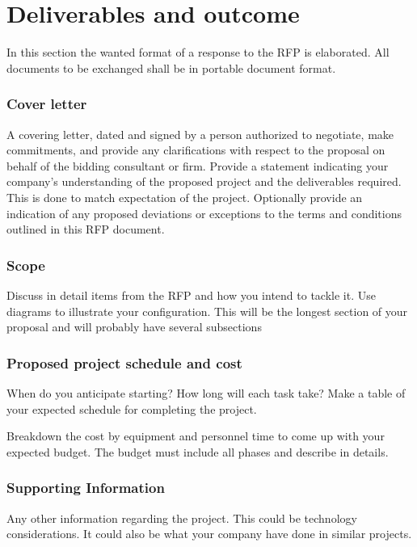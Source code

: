 \section{Deliverables and outcome}
In this section the wanted format of a response to the RFP is elaborated. All documents to be exchanged shall be in portable document format.

\subsubsection{Cover letter}
A covering letter, dated and signed by a person authorized to negotiate, make commitments, and provide any clarifications with respect to the proposal on behalf of the bidding consultant or firm. Provide a statement indicating your company’s understanding of the proposed project and the deliverables required. This is done to match expectation of the project. Optionally provide an indication of any proposed deviations or exceptions to the terms and conditions outlined in this RFP document.

\subsubsection{Scope}
Discuss in detail items from the RFP and how you intend to tackle it. Use diagrams to illustrate your configuration. This will be the longest section of your proposal and will probably have several subsections

\subsubsection{Proposed project schedule and cost}
When do you anticipate starting? How long will each task take? Make a table of your expected schedule for completing the project.

Breakdown the cost by equipment and personnel time to come up with your expected budget. The budget must include all phases and describe in details. 

\subsubsection{Supporting Information}
Any other information regarding the project. This could be technology considerations. It could also be what your company have done in similar projects. 